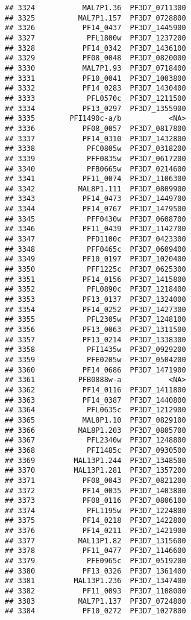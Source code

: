 \documentclass[12pt, a4paper]{article}\usepackage[]{graphicx}\usepackage[]{color}
\makeatletter
\newenvironment{kframe}{%
 \def\at@end@of@kframe{}%
 \ifinner\ifhmode%
  \def\at@end@of@kframe{\end{minipage}}%
  \begin{minipage}{\columnwidth}%
 \fi\fi%
 \def\FrameCommand##1{\hskip\@totalleftmargin \hskip-\fboxsep
 \colorbox{shadecolor}{##1}\hskip-\fboxsep
     \hskip-\linewidth \hskip-\@totalleftmargin \hskip\columnwidth}%
 \MakeFramed {\advance\hsize-\width
   \@totalleftmargin\z@ \linewidth\hsize
   \@setminipage}}%
 {\par\unskip\endMakeFramed%
 \at@end@of@kframe}
\newenvironment{knitrout}{}{} %
\makeatother
\begin{document}
\begin{knitrout}
\begin{kframe}
\begin{verbatim}
## 3324           MAL7P1.36  PF3D7_0711300
## 3325          MAL7P1.157  PF3D7_0728800
## 3326           PF14_0437  PF3D7_1445900
## 3327            PFL1800w  PF3D7_1237200
## 3328           PF14_0342  PF3D7_1436100
## 3329           PF08_0048  PF3D7_0820000
## 3330           MAL7P1.93  PF3D7_0718400
## 3331           PF10_0041  PF3D7_1003800
## 3332           PF14_0283  PF3D7_1430400
## 3333            PFL0570c  PF3D7_1211500
## 3334           PF13_0297  PF3D7_1355900
## 3335        PFI1490c-a/b           <NA>
## 3336           PF08_0057  PF3D7_0817800
## 3337           PF14_0310  PF3D7_1432800
## 3338            PFC0805w  PF3D7_0318200
## 3339            PFF0835w  PF3D7_0617200
## 3340            PFB0665w  PF3D7_0214600
## 3341           PF11_0074  PF3D7_1106300
## 3342          MAL8P1.111  PF3D7_0809900
## 3343           PF14_0473  PF3D7_1449700
## 3344           PF14_0767  PF3D7_1479500
## 3345            PFF0430w  PF3D7_0608700
## 3346           PF11_0439  PF3D7_1142700
## 3347            PFD1100c  PF3D7_0423300
## 3348            PFF0465c  PF3D7_0609400
## 3349           PF10_0197  PF3D7_1020400
## 3350            PFF1225c  PF3D7_0625300
## 3351           PF14_0156  PF3D7_1415800
## 3352            PFL0890c  PF3D7_1218400
## 3353           PF13_0137  PF3D7_1324000
## 3354           PF14_0252  PF3D7_1427300
## 3355            PFL2305w  PF3D7_1248100
## 3356           PF13_0063  PF3D7_1311500
## 3357           PF13_0214  PF3D7_1338300
## 3358            PFI1435w  PF3D7_0929200
## 3359            PFE0205w  PF3D7_0504200
## 3360           PF14_0686  PF3D7_1471900
## 3361          PFB0888w-a           <NA>
## 3362           PF14_0116  PF3D7_1411800
## 3363           PF14_0387  PF3D7_1440800
## 3364            PFL0635c  PF3D7_1212900
## 3365           MAL8P1.10  PF3D7_0829100
## 3366          MAL8P1.203  PF3D7_0805700
## 3367            PFL2340w  PF3D7_1248800
## 3368            PFI1485c  PF3D7_0930500
## 3369         MAL13P1.244  PF3D7_1348500
## 3370         MAL13P1.281  PF3D7_1357200
## 3371           PF08_0043  PF3D7_0821200
## 3372           PF14_0035  PF3D7_1403800
## 3373           PF08_0116  PF3D7_0806100
## 3374            PFL1195w  PF3D7_1224800
## 3375           PF14_0218  PF3D7_1422800
## 3376           PF14_0211  PF3D7_1421900
## 3377          MAL13P1.82  PF3D7_1315600
## 3378           PF11_0477  PF3D7_1146600
## 3379            PFE0965c  PF3D7_0519200
## 3380           PF13_0326  PF3D7_1361400
## 3381         MAL13P1.236  PF3D7_1347400
## 3382           PF11_0093  PF3D7_1108000
## 3383          MAL7P1.137  PF3D7_0724800
## 3384           PF10_0272  PF3D7_1027800

\end{verbatim}
\end{kframe}
\end{knitrout}
\end{document}
